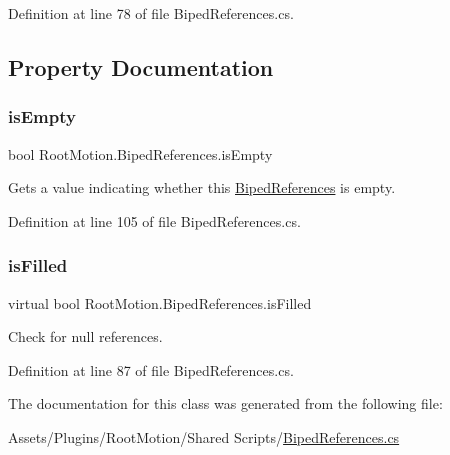 Definition at line 78 of file Biped\+References.\+cs.



\subsection{Property Documentation}
\mbox{\label{class_root_motion_1_1_biped_references_a300b9269aec71669fc38fb9b349cc075}} 
\subsubsection{\texorpdfstring{is\+Empty}{isEmpty}}
{\footnotesize\ttfamily bool Root\+Motion.\+Biped\+References.\+is\+Empty\hspace{0.3cm}{\ttfamily [get]}}



Gets a value indicating whether this \mbox{\hyperlink{class_root_motion_1_1_biped_references}{Biped\+References}} is empty. 



Definition at line 105 of file Biped\+References.\+cs.

\mbox{\label{class_root_motion_1_1_biped_references_a6520a3b816d79d54b2057ce1a5d04516}} 
\subsubsection{\texorpdfstring{is\+Filled}{isFilled}}
{\footnotesize\ttfamily virtual bool Root\+Motion.\+Biped\+References.\+is\+Filled\hspace{0.3cm}{\ttfamily [get]}}



Check for null references. 



Definition at line 87 of file Biped\+References.\+cs.



The documentation for this class was generated from the following file\+:\begin{DoxyCompactItemize}
\item 
Assets/\+Plugins/\+Root\+Motion/\+Shared Scripts/\mbox{\hyperlink{_biped_references_8cs}{Biped\+References.\+cs}}\end{DoxyCompactItemize}
